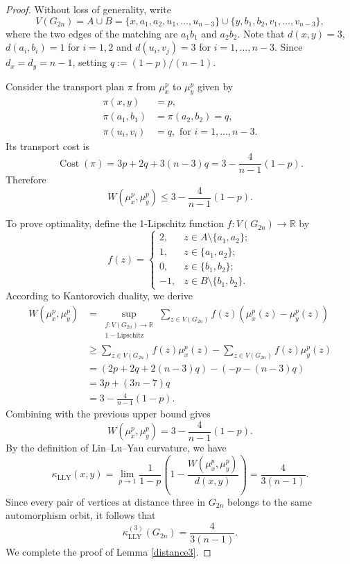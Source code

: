 \documentclass[10pt,a4paper]{article}
\theoremstyle{definition}
\theoremstyle{definition}
\theoremstyle{nonumber}
\begin{document}
\begin{proof}
Without loss of generality, write $$V(G_{2n})=A\cup B=\{x,a_1,a_2,u_1,\ldots,u_{n-3}\}\cup \{y,b_1,b_2,v_1,\ldots,v_{n-3}\},$$ where the two edges of the matching are $a_1b_1$ and $a_2b_2$. 
Note that $d(x,y)=3$, $d(a_i,b_i)=1$ for $i=1,2$
and $d(u_i,v_j)=3$ for $i=1,\ldots,n-3$.
Since $d_x=d_y=n-1$, setting $q:=(1-p)/(n-1)$.

Consider the transport plan $\pi$ from $\mu_x^p$ to $\mu_y^p$ given by
\begin{align*} 
\pi(x,y)&=p,\\
\pi(a_1,b_1)&=\pi(a_2,b_2)=q,\\
\pi(u_i,v_i)&=q, \text{ for } i=1,\ldots,n-3.
\end{align*}
Its transport cost is
$$
\operatorname{Cost}(\pi)=3p+2q+3(n-3)q=3-\frac{4}{n-1}(1-p).
$$
Therefore
$$
W(\mu_x^p,\mu_y^p)\leq3-\frac{4}{n-1}(1-p).
$$

To prove optimality, define the 1-Lipschitz function $f:V(G_{2n})\to\mathbb{R}$ by 
$$
f(z)=
\begin{cases}
2, & z\in A\setminus\{a_1,a_2\};\\
1, & z\in\{a_1,a_2\};\\
0, & z\in\{b_1,b_2\};\\
-1, & z\in B\setminus\{b_1,b_2\}.
\end{cases}
$$
According to Kantorovich duality, we derive
\begin{align*}
W(\mu_x^p, \mu_y^p) &= \sup_{\substack{f: V(G_{2n}) \to \mathbb{R} \\ 1-\text{Lipschitz}}} \sum_{z \in V(G_{2n})} f(z) \left( \mu_x^p(z) - \mu_y^p(z) \right)\\
&\geq\sum_{z\in V(G_{2n})}f(z)\mu_x^p(z)
-\sum_{z\in V(G_{2n})}f(z)\mu_y^p(z)\\
&=\left(2p+2q+2(n-3)q\right)
-\left(-p-(n-3)q\right)\\
&=3p+(3n-7)q\\
&=3-\frac{4}{n-1}(1-p).
\end{align*}
Combining with the previous upper bound gives
$$
W(\mu_x^p,\mu_y^p)=3-\frac{4}{n-1}(1-p).
$$
By the definition of Lin--Lu--Yau curvature, we have
$$
\kappa_{\mathrm{LLY}}(x,y)=\lim_{p\to1}\frac{1}{1-p} \left( 1 - \frac{W(\mu_x^p, \mu_y^p)}{d(x, y)} \right)=\frac{4}{3(n-1)}.
$$
Since every pair of vertices at distance three in $G_{2n}$
belongs to the same automorphism orbit, it follows that
$$
\kappa_{\mathrm{LLY}}^{(3)}(G_{2n})=\frac{4}{3(n-1)}.
$$
We complete the proof of Lemma \ref{distance3}.
\end{proof}
\end{document}
